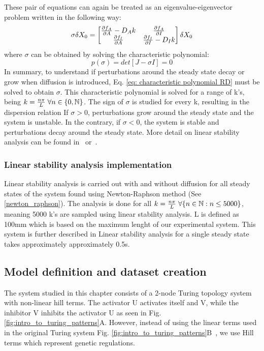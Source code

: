 These pair of equations can again be treated as an eigenvalue-eigenvector problem written in the following way:
\begin{equation}
    \sigma \delta X_{0} = \begin{bmatrix}
                              \pdv{f_{A}}{A} - D_{A}k &
                              \pdv{f_{A}}{I}  \\
                              \pdv{f_{I}}{A} &
                              \pdv{f_{I}}{I} - D_{I}k
    \end{bmatrix}\delta X_{0}
    \label{eq: jacobian RD}
\end{equation}
where $\sigma$ can be obtained by solving the characteristic polynomial:
\begin{equation}
    p(\sigma) = det[J-\sigma I] = 0
    \label{eq: characteristic polynomial RD}
\end{equation}
In summary, to understand if perturbations around the steady state decay or grow when diffusion is introduced, Eq. \eqref{eq: characteristic polynomial RD} must be solved to obtain $\sigma$.
This characteristic polynomial is solved for a range of k's, being $k=\frac{n\pi}{L} \hspace{0.1cm}\forall n \in \{0, \mathbb{N}\} $.
The sign of $\sigma$ is studied for every k, resulting in the dispersion relation %
If $\sigma > 0$, perturbations grow around the steady state and the system is unstable.
In the contrary, if  $\sigma < 0$, the system is stable and perturbations decay around the steady state.
More detail on linear stability analysis can be found in~\cite{J.DMurray2002} or~\cite{Glendinning1994}.
\subsubsection{Linear stability analysis implementation}
Linear stability analysis is carried out with and without diffusion for all steady states of the system found using Newton-Raphson method (See \ref{newton_raphson}).
The analysis is done for all $k=\frac{n\pi}{L} \hspace{0.1cm}\forall \{n \in \mathbb{N} : n \leq 5000\} $, meaning 5000 k's are sampled using linear stability analysis.
L is defined as 100mm which is based on the maximum lenght of our experimental system.
This system is further described in %
Linear stability analysis for a single steady state takes approximately approximately 0.5s.

\subsection{Model definition and dataset creation}
The system studied in this chapter consists of a 2-node Turing topology system with non-linear hill terms.
The activator U activates itself and V, while the inhibitor V inhibits the activator U as seen in Fig. \ref{fig:intro_to_turing_patterns}A.
However, instead of using the linear terms used in the original Turing system Fig. \ref{fig:intro_to_turing_patterns}B~\parencite{Turing1952}, we use Hill terms which represent genetic regulations.

